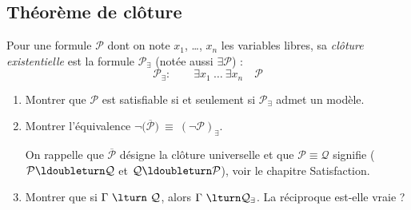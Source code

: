 \documentclass[11pt,class=report,crop=false]{standalone}
\begin{document}
\subsection*{Théorème de clôture}



\begin{exercicecours}
	Pour une formule $\mathcal{P}$ dont on note $x_1$, \ldots, $x_n$ les variables libres, sa \emph{clôture existentielle} est la formule $\mathcal{P}_{\exists}$ (notée aussi $\exists \mathcal{P}$) :
		\[
	\mathcal{P}_{\exists} : \qquad 
	\exists x_1 \ \ldots \ \exists x_n \quad \mathcal{P}
	\] 
	\begin{enumerate}
		\item Montrer que $\mathcal{P}$ est satisfiable si et seulement si $\mathcal{P}_{\exists}$ admet un modèle.
		
		
		\item Montrer l'équivalence $\lnot \big( \overline{\mathcal{P}} \big) \ \equiv \ (\lnot \mathcal{P})_{\exists}$. 
		
		On rappelle que $\overline{\mathcal{P}}$ désigne la clôture universelle et que $\mathcal{P} \equiv \mathcal{Q}$ signifie ($\mathcal{P} \ldoubleturn \mathcal{Q}$ et $\mathcal{Q} \ldoubleturn \mathcal{P}$), voir le chapitre \og{}Satisfaction\fg{}.
		
		\item Montrer que si $\Gamma \ \lturn \ \mathcal{Q}$, alors $\Gamma \ \lturn \mathcal{Q}_{\exists}$.
		La réciproque est-elle vraie ?
	\end{enumerate}
\end{exercicecours}	
	
\end{document}
